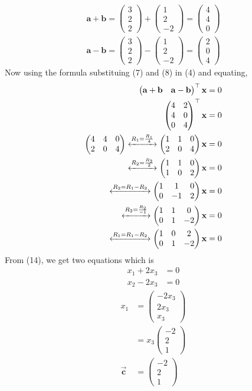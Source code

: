 \documentclass[12pt]{article}
\newcommand{\myvec}[1]{\ensuremath{\begin{pmatrix}#1\end{pmatrix}}}
\let\vec\mathbf
\begin{document}
\begin{enumerate}
\begin{align}
\vec{a+b}=\myvec{3\\2\\2}+\myvec{1\\2\\-2}=\myvec{4\\4\\0}\label{7}\\
\vec{a-b}=\myvec{3\\2\\2}-\myvec{1\\2\\-2}=\myvec{2\\0\\4}\label{8}
\end{align}
Now using the formula substituing (7) and (8) in (4) and equating,
\begin{align}
\myvec{\vec{a}+\vec{b}& \vec{a}-\vec{b}}^\top\vec{x}&=0\\
\myvec{
4&2\\
4&0\\
0&4
}^\top \vec{x}&=0\\
\myvec{
4&4&0\\
2&0&4
}
\xleftrightarrow[]{R_1=\frac{R_1}{4}}
\myvec{
1&1&0\\
2&0&4
}\vec{x}&=0\\\xleftrightarrow[]{R_2=\frac{R_2}{2}}
\myvec{
1&1&0\\
1&0&2
}\vec{x}&=0\\
\xleftrightarrow[]{R_2={R_1}-{R_2}}
\myvec{
1&1&0\\
0&-1&2
}\vec{x}&=0\\
\xleftrightarrow[]{R_2=\frac{R_2}{-1}}
\myvec{
1&1&0\\
0&1&-2
}\vec{x}&=0\\
\xleftrightarrow[]{R_1={R_1}-{R_2}}
\myvec{
1&0&2\\
0&1&-2
}\vec{x}&=0\label{14}
\end{align}
From (14), we get two equations which is 
\begin{align}
x_1+2x_3&=0\\
x_2-2x_3&=0
\end{align}
\begin{align}
x_1&=\myvec{-2x_3\\2x_3\\x_3}\\
&=x_3\myvec{-2\\2\\1}\\
\overrightarrow{\vec{c}}&=\myvec{-2\\2\\1}

\end{align}
\end{enumerate}
\end{document}
